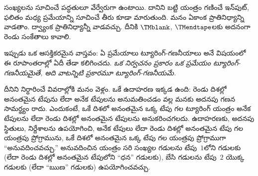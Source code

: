 \documentclass[../../../include/open-logic-section]{subfiles}
\begin{document}
సంఖ్యలను సూచించే పద్ధతులూ వేర్వేరుగా ఉంటాయి. దానిని బట్టి యంత్రం
గణించే ఇన్‌పుట్, ఫలితం మధ్య ప్రమేయాన్ని సూచించే తీరు కూడా మారుతుంది.
మనం ఏకాంక ప్రాతినిధ్యాన్ని వాడతాం. ద్వ్యాంక ప్రాతినిధ్యాన్నీ వాడవచ్చు.
దీనికి $\TMblank$, $\TMendtape$లకు అదనంగా రెండు సంకేతాలు కావాలి.

ఇప్పుడు ఒక ఆసక్తికరమైన వాస్తవం: ఏ ప్రమేయాలు ట్యూరింగ్-గణనీయాలు అనే విషయంలో
ఈ రూపాంతరాల్లో ఏదీ తేడా కలిగించదు. \emph{ఒక నిర్వచనం ప్రకారం ఒక ప్రమేయం
ట్యూరింగ్-గణనీయమైతే, అది వాటన్నిటి ప్రకారమూ ట్యూరింగ్-గణనీయమే.}

దీనిని నిర్ధారించే వివరాల్లోకి మనం వెళ్లం. ఒకే ఉదాహరణ ఇక్కడ ఉంది: రెండు
దిశల్లో అనంతమైన టేపును లేదా అనేక టేపులను అనుమతించడం వల్ల మనకు అదనపు గణన
సామర్థ్యం రాదు. ఎందుకంటే, ఒకే దిశలో అనంతమైన ఒక్క టేపు గల ట్యూరింగ్ యంత్రం
అనేక టేపులను లేదా రెండు దిశల్లో అనంతమైన టేపులను అనుకరించగలదు. ఉదాహరణకు,
అదనపు స్థితులు, నిర్దేశాలను ఉపయోగించి, అనేక టేపులు లేదా రెండు దిశల్లో అనంతమైన
టేపు గల యంత్రపు ప్రోగ్రామును, ఒకే దిశలో అనంతమైన ఒక్క టేపు గల యంత్రపు
ప్రోగ్రాముగా ``అనువదించవచ్చు.'' అనువదించిన యంత్రం సరి సంఖ్యల గడులను టేపు~$1$లోని
గడులకు (లేదా రెండు దిశల్లో అనంతమైన టేపులోని ``ధన'' గడులకు), బేసి గడులను
టేపు~$2$ యొక్క గడులకు (లేదా ``ఋణ'' గడులకు) ఉపయోగించవచ్చు.
\end{document}
